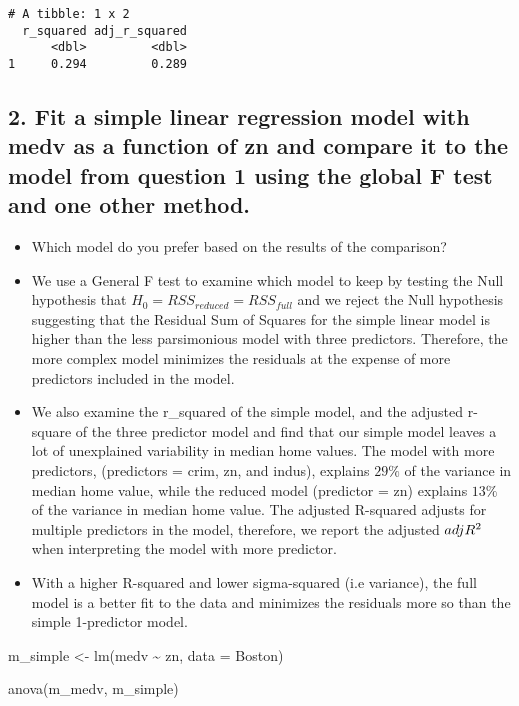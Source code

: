 \documentclass[
  letterpaper,
  DIV=11,
  numbers=noendperiod]{scrartcl}
\newenvironment{Shaded}{\begin{snugshade}}{\end{snugshade}}
\newcommand{\AttributeTok}[1]{\textcolor[rgb]{0.40,0.45,0.13}{#1}}
\newcommand{\FunctionTok}[1]{\textcolor[rgb]{0.28,0.35,0.67}{#1}}
\newcommand{\NormalTok}[1]{\textcolor[rgb]{0.00,0.23,0.31}{#1}}
\newcommand{\OtherTok}[1]{\textcolor[rgb]{0.00,0.23,0.31}{#1}}
\newcommand{\SpecialCharTok}[1]{\textcolor[rgb]{0.37,0.37,0.37}{#1}}
\begin{document}
\begin{verbatim}
# A tibble: 1 x 2
  r_squared adj_r_squared
      <dbl>         <dbl>
1     0.294         0.289
\end{verbatim}

\subsection{2. Fit a simple linear regression model with medv as a
function of zn and compare it to the model from question 1 using the
global F test and one other
method.}\label{fit-a-simple-linear-regression-model-with-medv-as-a-function-of-zn-and-compare-it-to-the-model-from-question-1-using-the-global-f-test-and-one-other-method.}

\begin{itemize}
\item
  Which model do you prefer based on the results of the comparison?
\item
  We use a General F test to examine which model to keep by testing the
  Null hypothesis that \(H_0 = RSS_{reduced} = RSS_{full}\) and we
  reject the Null hypothesis suggesting that the Residual Sum of Squares
  for the simple linear model is higher than the less parsimonious model
  with three predictors. Therefore, the more complex model minimizes the
  residuals at the expense of more predictors included in the model.
\item
  We also examine the r\_squared of the simple model, and the adjusted
  r-square of the three predictor model and find that our simple model
  leaves a lot of unexplained variability in median home values. The
  model with more predictors, (predictors = crim, zn, and indus),
  explains \(29\%\) of the variance in median home value, while the
  reduced model (predictor = zn) explains \(13\%\) of the variance in
  median home value. The adjusted R-squared adjusts for multiple
  predictors in the model, therefore, we report the adjusted
  \(adj \space R^2\) when interpreting the model with more predictor.
\item
  With a higher R-squared and lower sigma-squared (i.e variance), the
  full model is a better fit to the data and minimizes the residuals
  more so than the simple 1-predictor model.
\end{itemize}

\begin{Shaded}
\begin{Highlighting}[]
\NormalTok{m\_simple }\OtherTok{\textless{}{-}} \FunctionTok{lm}\NormalTok{(medv }\SpecialCharTok{\textasciitilde{}}\NormalTok{ zn, }\AttributeTok{data =}\NormalTok{ Boston)}

\FunctionTok{anova}\NormalTok{(m\_medv, m\_simple)}
\end{Highlighting}
\end{Shaded}
\end{document}
